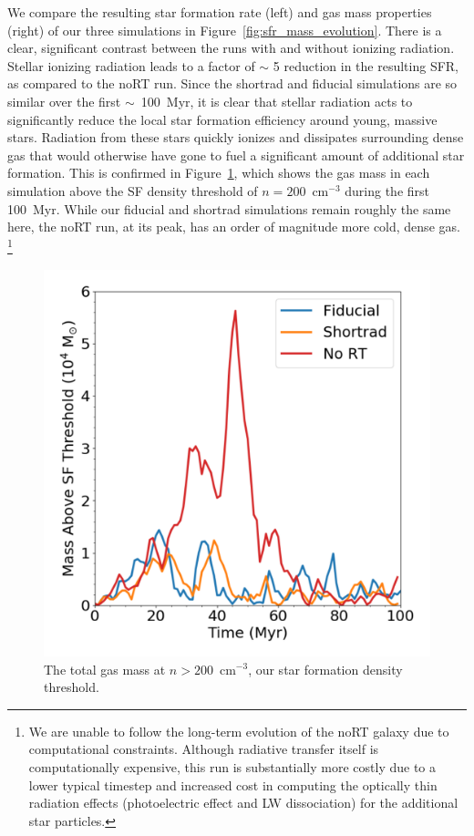 \documentclass[twocolumn]{aastex62}
\begin{document}
We compare the resulting star formation rate (left) and gas mass properties (right) of our three simulations in Figure~\ref{fig:sfr_mass_evolution}. There is a clear, significant contrast between the runs with and without ionizing radiation. Stellar ionizing radiation leads to a factor of $\sim$ 5 reduction in the resulting SFR, as compared to the noRT run. Since the shortrad and fiducial simulations are so similar over the first $\sim$~100~Myr, it is clear that stellar radiation acts to significantly reduce the local star formation efficiency around young, massive stars. Radiation from these stars quickly ionizes and dissipates surrounding dense gas that would otherwise have gone to fuel a significant amount of additional star formation. This is confirmed in Figure~\ref{fig:sf gas}, which shows the gas mass in each simulation above the SF density threshold of $n = 200$~cm$^{-3}$ during the first 100~Myr. While our fiducial and shortrad simulations remain roughly the same here, the noRT run, at its peak, has an order of magnitude more cold, dense gas. \footnote{We are unable to follow the long-term evolution of the noRT galaxy due to computational constraints. Although radiative transfer itself is computationally expensive, this run is substantially more costly due to a lower typical timestep and increased cost in computing the optically thin radiation effects (photoelectric effect and LW dissociation) for the additional star particles.}

\begin{figure}
\centering
\includegraphics[width=0.99\linewidth]{mass_density_cut}
\caption{The total gas mass at $n > 200$~cm$^{-3}$, our star formation density threshold.}
\label{fig:sf gas}
\end{figure}
\end{document}
